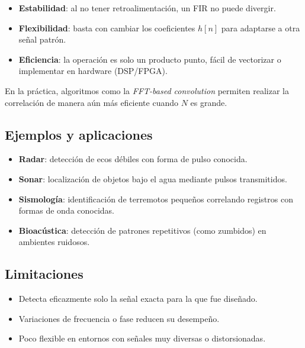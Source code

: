\begin{itemize}
	\item \textbf{Estabilidad}: al no tener retroalimentación, un FIR no puede divergir.  
	\item \textbf{Flexibilidad}: basta con cambiar los coeficientes $h[n]$ para adaptarse a otra señal patrón.  
	\item \textbf{Eficiencia}: la operación es solo un producto punto, fácil de vectorizar o implementar en hardware (DSP/FPGA).  
\end{itemize}

En la práctica, algoritmos como la \emph{FFT-based convolution} permiten realizar la correlación de manera aún más eficiente cuando $N$ es grande.

\subsection{Ejemplos y aplicaciones}

\begin{itemize}
	\item \textbf{Radar}: detección de ecos débiles con forma de pulso conocida.  
	\item \textbf{Sonar}: localización de objetos bajo el agua mediante pulsos transmitidos.  
	\item \textbf{Sismología}: identificación de terremotos pequeños correlando registros con formas de onda conocidas.  
	\item \textbf{Bioacústica}: detección de patrones repetitivos (como zumbidos) en ambientes ruidosos.  
\end{itemize}

\subsection{Limitaciones}

\begin{itemize}
	\item Detecta eficazmente solo la señal exacta para la que fue diseñado.  
	\item Variaciones de frecuencia o fase reducen su desempeño.  
	\item Poco flexible en entornos con señales muy diversas o distorsionadas.  
\end{itemize}



